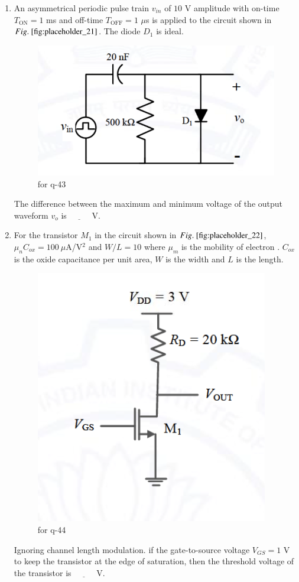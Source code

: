 \documentclass[journal,12pt,onecolumn]{IEEEtran}
\theoremstyle{remark}
\begin{document}
\begin{enumerate}
\hfill {}

\item An asymmetrical periodic pulse train $v_{in}$ of $10$ V amplitude with on-time $T_{\text{ON}} = 1$ ms and off-time $T_{\text{OFF}} = 1$ $\mu$s is applied to the circuit shown in $\figref{fig:placeholder_21}$. The diode $D_1$ is ideal.  
\begin{figure}[H]
    \centering
    \includegraphics[width=0.4\columnwidth]{figs/21.png}
    \caption{\centering for q-43}
    \label{fig:placeholder_21}
\end{figure}
The difference between the maximum and minimum voltage of the output waveform $v_o$  is $\underline{\hspace{1cm}}$ V.  

\hfill {}

\item For the transistor $M_1$ in the circuit shown in $\figref{fig:placeholder_22}$, $\mu_n C_{ox} = 100\ \mu$A/V$^2$ and $W/L = 10$ where $\mu_m$ is the mobility of electron . $C_{ox} $  is the oxide capacitance per unit area, $W$ is the width and $L$ is the length.
\begin{figure}[H]
    \centering
    \includegraphics[width=0.3\columnwidth]{figs/22.png}
    \caption{\centering for q-44}
    \label{fig:placeholder_22}
\end{figure}

Ignoring channel length modulation. if the gate-to-source voltage $V_{GS} = 1$ V to keep the transistor at the edge of saturation, then the threshold voltage of the transistor   is $\underline{\hspace{1cm}}$ V.  


\end{enumerate}
\end{document}
